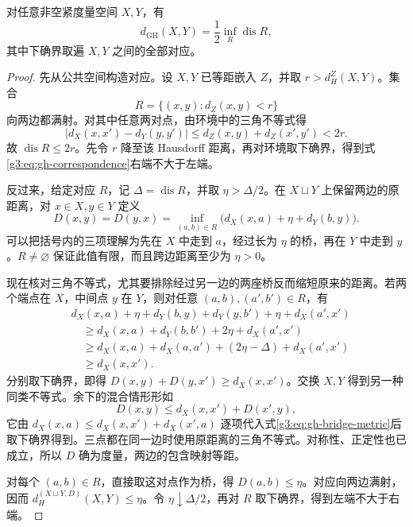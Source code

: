 \begin{theorem}\label{g3:thm:gh-correspondence}
	对任意非空紧度量空间 \(X,Y\)，有
	\begin{equation}\label{g3:eq:gh-correspondence}
		d_{\mathrm{GH}}(X,Y)=\frac12\inf_R\operatorname{dis}R,
	\end{equation}
	其中下确界取遍 \(X,Y\) 之间的全部对应。
\end{theorem}
\begin{proof}
	先从公共空间构造对应。设 \(X,Y\) 已等距嵌入 \(Z\)，并取 \(r>d_H^Z(X,Y)\)。集合
	\[
		R=\{(x,y):d_Z(x,y)<r\}
	\]
	向两边都满射。对其中任意两对点，由环境中的三角不等式得
	\[
		\bigl|d_X(x,x')-d_Y(y,y')\bigr|
		\le d_Z(x,y)+d_Z(x',y')<2r.
	\]
	故 \(\operatorname{dis}R\le2r\)。先令 \(r\) 降至该 Hausdorff 距离，再对环境取下确界，得到式\eqref{g3:eq:gh-correspondence}右端不大于左端。

	反过来，给定对应 \(R\)，记 \(\Delta=\operatorname{dis}R\)，并取 \(\eta>\Delta/2\)。在 \(X\sqcup Y\) 上保留两边的原距离，对 \(x\in X,y\in Y\) 定义
	\begin{equation}\label{g3:eq:gh-bridge-metric}
		D(x,y)=D(y,x)
		=\inf_{(a,b)\in R}
		\bigl(d_X(x,a)+\eta+d_Y(b,y)\bigr).
	\end{equation}
	可以把括号内的三项理解为先在 \(X\) 中走到 \(a\)，经过长为 \(\eta\) 的桥，再在 \(Y\) 中走到 \(y\)。\(R\ne\varnothing\) 保证此值有限，而且跨边距离至少为 \(\eta>0\)。

	现在核对三角不等式，尤其要排除经过另一边的两座桥反而缩短原来的距离。若两个端点在 \(X\)，中间点 \(y\) 在 \(Y\)，则对任意 \((a,b),(a',b')\in R\)，有
	\[
	\begin{aligned}
		&d_X(x,a)+\eta+d_Y(b,y)
		+d_Y(y,b')+\eta+d_X(a',x')\\
		&\quad\ge d_X(x,a)+d_Y(b,b')+2\eta+d_X(a',x')\\
		&\quad\ge d_X(x,a)+d_X(a,a')+(2\eta-\Delta)+d_X(a',x')\\
		&\quad\ge d_X(x,x').
	\end{aligned}
	\]
	分别取下确界，即得 \(D(x,y)+D(y,x')\ge d_X(x,x')\)。交换 \(X,Y\) 得到另一种同类不等式。余下的混合情形形如
	\[
		D(x,y)\le d_X(x,x')+D(x',y),
	\]
	它由 \(d_X(x,a)\le d_X(x,x')+d_X(x',a)\) 逐项代入式\eqref{g3:eq:gh-bridge-metric}后取下确界得到。三点都在同一边时使用原距离的三角不等式。对称性、正定性也已成立，所以 \(D\) 确为度量，两边的包含映射等距。

	对每个 \((a,b)\in R\)，直接取这对点作为桥，得 \(D(a,b)\le\eta\)。对应向两边满射，因而 \(d_H^{(X\sqcup Y,D)}(X,Y)\le\eta\)。令 \(\eta\downarrow\Delta/2\)，再对 \(R\) 取下确界，得到左端不大于右端。
\end{proof}

